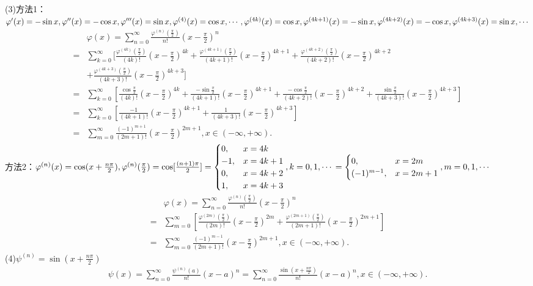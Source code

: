 \documentclass[12pt,UTF8]{ctexart}
\newcommand\Ser[1]{\sum_{n=#1}^\infty}
\newcommand{\SER}[2]{\sum_{#1=#2}^\infty}
\begin{document}
\begin{enumerate}
(3)方法1：$\varphi'(x)=-\sin x,\varphi''(x)=-\cos x,\varphi'''(x)=\sin x,\varphi^{(4)}(x)=\cos x,\cdots,\\
\varphi^{(4k)}(x)=\cos x,\varphi^{(4k+1)}(x)=-\sin x,\varphi^{(4k+2)}(x)=-\cos x,\varphi^{(4k+3)}(x)=\sin x,\cdots$
\[\begin{split}
&\varphi(x)=\Ser{0}\frac{\varphi^{(n)}(\frac\pi2)}{n!}(x-\frac\pi2)^n\\
=&\SER{k}{0}[\frac{\varphi^{(4k)}(\frac\pi2)}{(4k)!}(x-\frac\pi2)^{4k}+\frac{\varphi^{(4k+1)}(\frac\pi2)}{(4k+1)!}(x-\frac\pi2)^{4k+1}+\frac{\varphi^{(4k+2)}(\frac\pi2)}{(4k+2)!}(x-\frac\pi2)^{4k+2}\\
&+\frac{\varphi^{(4k+3)}(\frac\pi2)}{(4k+3)!}(x-\frac\pi2)^{4k+3}]\\
=&\SER{k}{0}[\frac{\cos\frac\pi2}{(4k)!}(x-\frac\pi2)^{4k}+\frac{-\sin\frac\pi2}{(4k+1)!}(x-\frac\pi2)^{4k+1}+\frac{-\cos\frac\pi2}{(4k+2)!}(x-\frac\pi2)^{4k+2}+\frac{\sin\frac\pi2}{(4k+3)!}(x-\frac\pi2)^{4k+3}]\\
=&\SER{k}{0}[\frac{-1}{(4k+1)!}(x-\frac\pi2)^{4k+1}+\frac{1}{(4k+3)!}(x-\frac\pi2)^{4k+3}]\\
=&\SER{m}{0}\frac{(-1)^{m+1}}{(2m+1)!}(x-\frac\pi2)^{2m+1},x\in(-\infty,+\infty).
\end{split}\]
方法2：$\varphi^{(n)}(x)=\cos(x+\frac{n\pi}2),\\
\varphi^{(n)}(\frac\pi2)=\cos[\frac{(n+1)\pi}2]=\begin{cases}
0,&x=4k\\
-1,&x=4k+1\\
0,&x=4k+2\\
1,&x=4k+3
\end{cases},k=0,1,\cdots\\
=\begin{cases}
0,&x=2m\\
(-1)^{m-1},&x=2m+1
\end{cases},m=0,1,\cdots$
\[\begin{split}
&\varphi(x)=\Ser{0}\frac{\varphi^{(n)}(\frac\pi2)}{n!}(x-\frac\pi2)^n\\
=&\SER{m}{0}[\frac{\varphi^{(2m)}(\frac\pi2)}{(2m)!}(x-\frac\pi2)^{2m}+\frac{\varphi^{(2m+1)}(\frac\pi2)}{(2m+1)!}(x-\frac\pi2)^{2m+1}]\\
=&\SER{m}{0}\frac{(-1)^{m-1}}{(2m+1)!}(x-\frac\pi2)^{2m+1},x\in(-\infty,+\infty).
\end{split}\]
(4)$\psi^{(n)}=\sin(x+\frac{n\pi}2)$
\[\begin{split}
\psi(x)=\Ser{0}\frac{\psi^{(n)}(a)}{n!}(x-a)^n=\Ser{0}\frac{\sin(x+\frac{n\pi}2)}{n!}(x-a)^n,x\in(-\infty,+\infty).
\end{split}\]


\end{enumerate}
\end{document}
